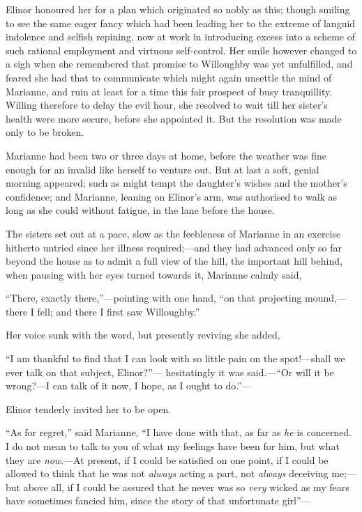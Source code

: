 Elinor honoured her for a plan which originated
so nobly as this; though smiling to see the same eager
fancy which had been leading her to the extreme of languid
indolence and selfish repining, now at work in introducing
excess into a scheme of such rational employment and virtuous
self-control. Her smile however changed to a sigh when she
remembered that promise to Willoughby was yet unfulfilled,
and feared she had that to communicate which might again
unsettle the mind of Marianne, and ruin at least for a time
this fair prospect of busy tranquillity.  Willing therefore
to delay the evil hour, she resolved to wait till her
sister's health were more secure, before she appointed it.
But the resolution was made only to be broken.

Marianne had been two or three days at home, before
the weather was fine enough for an invalid like herself
to venture out.  But at last a soft, genial morning appeared;
such as might tempt the daughter's wishes and the
mother's confidence; and Marianne, leaning on Elinor's arm,
was authorised to walk as long as she could without fatigue,
in the lane before the house.

The sisters set out at a pace, slow as the feebleness
of Marianne in an exercise hitherto untried since her
illness required;---and they had advanced only so far
beyond the house as to admit a full view of the hill,
the important hill behind, when pausing with her eyes
turned towards it, Marianne calmly said,

``There, exactly there,''---pointing with one hand,
``on that projecting mound,---there I fell; and there
I first saw Willoughby.''

Her voice sunk with the word, but presently reviving she added,

``I am thankful to find that I can look with so little pain
on the spot!---shall we ever talk on that subject, Elinor?''---%
hesitatingly it was said.---``Or will it be wrong?---I can talk
of it now, I hope, as I ought to do.''---%

Elinor tenderly invited her to be open.

``As for regret,'' said Marianne, ``I have done with that,
as far as \emph{he} is concerned.  I do not mean to talk to you
of what my feelings have been for him, but what they
are \emph{now}.---At present, if I could be satisfied on one point,
if I could be allowed to think that he was not \emph{always}
acting a part, not \emph{always} deceiving me;---but above all,
if I could be assured that he never was so \emph{very} wicked
as my fears have sometimes fancied him, since the story
of that unfortunate girl''---%

